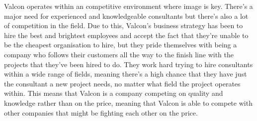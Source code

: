 Valcon operates within an competitive environment where image is key. 
There's a major need for experienced and knowledgeable consultants but there's also a lot of competition in the field.
Due to this, Valcon's business strategy has been to hire the best and brightest employees and accept the fact that they're unable to be the cheapest organisation to hire,
but they pride themselves with being a company who follows their customers all the way to the finish line with the projects that they've been hired to do. 
They work hard trying to hire consultants within a wide range of fields, meaning there's a high chance that they have just the consultant a new project needs, no matter what field the project operates within. 
This means that Valcon is a company competing on quality and knowledge rather than on the price, meaning that Valcon is able to compete with other companies that might be fighting each other on the price.